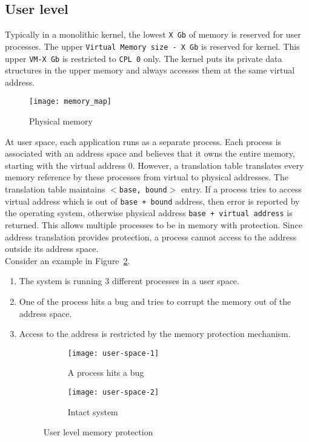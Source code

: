 \subsection{User level}
\label{subsec:user level}
Typically in a monolithic kernel, the lowest \texttt{X Gb} of memory is reserved for user processes. The upper \texttt{Virtual Memory size - X Gb}  is reserved for kernel. This upper \texttt{VM-X Gb} is restricted to \texttt{CPL 0} only. The kernel puts its private data structures in the upper memory and always accesses them at the same virtual address. 
\begin{figure}[!ht]
\centering
\texttt{[image: memory\_map]}
\caption{Physical memory}
\label{fig:memmap}
\end{figure}
At user space, each application runs as a separate process. Each process is associated with an address space and believes that it owns the entire memory, starting with the virtual address 0. However, a translation table translates every memory reference by these processes from virtual to physical addresses. The translation table maintains \texttt{$<$base, bound$>$} entry. If a process tries to access virtual address which is out of \texttt{base + bound} address, then error is reported by the operating system, otherwise physical address \texttt{base + virtual address} is returned. This allows multiple processes to be in memory with protection. Since address translation provides protection, a process cannot access to the address outside its address space.
\\[3mm]
Consider an example in Figure~\ref{fig:User space}.
\begin{enumerate}
\item The system is running 3 different processes in a user space.
\item One of the process hits a bug and tries to corrupt the memory out of the address space.
\item Access to the address is restricted by the memory protection mechanism.
\begin{figure}[!ht]
    \centering
    \begin{subfigure}[b]{0.49\textwidth}
	\texttt{[image: user-space-1]}
	\caption{A process hits a bug}
    \end{subfigure}
	\hfill
    \begin{subfigure}[b]{0.49\textwidth}
	\texttt{[image: user-space-2]}
	\caption{Intact system}
    \end{subfigure}
    \caption{User level memory protection}\label{fig:User space}
\end{figure}
\end{enumerate}

